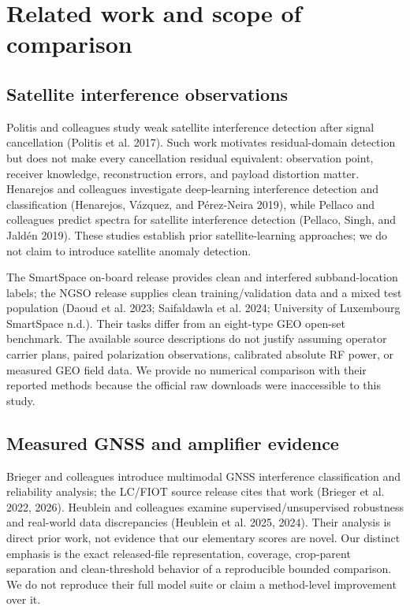 \documentclass[
  10pt,
]{article}
\begin{document}
\section{Related work and scope of
comparison}\label{related-work-and-scope-of-comparison}

\subsection{Satellite interference
observations}\label{satellite-interference-observations}

Politis and colleagues study weak satellite interference detection after
signal cancellation (Politis et al. 2017). Such work motivates
residual-domain detection but does not make every cancellation residual
equivalent: observation point, receiver knowledge, reconstruction
errors, and payload distortion matter. Henarejos and colleagues
investigate deep-learning interference detection and classification
(Henarejos, Vázquez, and Pérez-Neira 2019), while Pellaco and colleagues
predict spectra for satellite interference detection (Pellaco, Singh,
and Jaldén 2019). These studies establish prior satellite-learning
approaches; we do not claim to introduce satellite anomaly detection.

The SmartSpace on-board release provides clean and interfered
subband-location labels; the NGSO release supplies clean
training/validation data and a mixed test population (Daoud et al. 2023;
Saifaldawla et al. 2024; University of Luxembourg SmartSpace n.d.).
Their tasks differ from an eight-type GEO open-set benchmark. The
available source descriptions do not justify assuming operator carrier
plans, paired polarization observations, calibrated absolute RF power,
or measured GEO field data. We provide no numerical comparison with
their reported methods because the official raw downloads were
inaccessible to this study.

\subsection{Measured GNSS and amplifier
evidence}\label{measured-gnss-and-amplifier-evidence}

Brieger and colleagues introduce multimodal GNSS interference
classification and reliability analysis; the LC/FIOT source release
cites that work (Brieger et al. 2022, 2026). Heublein and colleagues
examine supervised/unsupervised robustness and real-world data
discrepancies (Heublein et al. 2025, 2024). Their analysis is direct
prior work, not evidence that our elementary scores are novel. Our
distinct emphasis is the exact released-file representation, coverage,
crop-parent separation and clean-threshold behavior of a reproducible
bounded comparison. We do not reproduce their full model suite or claim
a method-level improvement over it.
\end{document}
